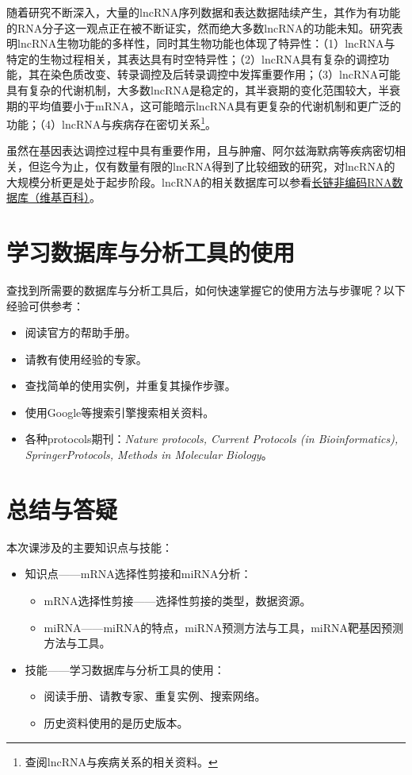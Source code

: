 \documentclass[11pt,a4paper,twoside]{book}
\begin{document}
随着研究不断深入，大量的lncRNA序列数据和表达数据陆续产生，其作为有功能的RNA分子这一观点正在被不断证实，然而绝大多数lncRNA的功能未知。研究表明lncRNA生物功能的多样性，同时其生物功能也体现了特异性：（1）lncRNA与特定的生物过程相关，其表达具有时空特异性；（2）lncRNA具有复杂的调控功能，其在染色质改变、转录调控及后转录调控中发挥重要作用；（3）lncRNA可能具有复杂的代谢机制，大多数lncRNA是稳定的，其半衰期的变化范围较大，半衰期的平均值要小于mRNA，这可能暗示lncRNA具有更复杂的代谢机制和更广泛的功能；（4）lncRNA与疾病存在密切关系\footnote{查阅lncRNA与疾病关系的相关资料。}。

虽然在基因表达调控过程中具有重要作用，且与肿瘤、阿尔兹海默病等疾病密切相关，但迄今为止，仅有数量有限的lncRNA得到了比较细致的研究，对lncRNA的大规模分析更是处于起步阶段。lncRNA的相关数据库可以参看\href{http://zh.wikipedia.org/wiki/\%E9\%95\%BF\%E9\%93\%BE\%E9\%9D\%9E\%E7\%BC\%96\%E7\%A0\%81RNA\%E6\%95\%B0\%E6\%8D\%AE\%E5\%BA\%93}{长链非编码RNA数据库（维基百科）}。

\section{学习数据库与分析工具的使用}
查找到所需要的数据库与分析工具后，如何快速掌握它的使用方法与步骤呢？以下经验可供参考：
\begin{itemize}
  \item 阅读官方的帮助手册。
  \item 请教有使用经验的专家。
  \item 查找简单的使用实例，并重复其操作步骤。
  \item 使用Google等搜索引擎搜索相关资料。
  \item 各种protocols期刊：\textit{Nature protocols, Current Protocols (in Bioinformatics), SpringerProtocols, Methods in Molecular Biology}。
\end{itemize}

\section{总结与答疑}
本次课涉及的主要知识点与技能：
\begin{itemize}
  \item 知识点——mRNA选择性剪接和miRNA分析：
    \begin{itemize}
      \item mRNA选择性剪接——选择性剪接的类型，数据资源。
      \item miRNA——miRNA的特点，miRNA预测方法与工具，miRNA靶基因预测方法与工具。
    \end{itemize}
  \item 技能——学习数据库与分析工具的使用：
    \begin{itemize}
      \item 阅读手册、请教专家、重复实例、搜索网络。
      \item 历史资料使用的是历史版本。
    \end{itemize}
\end{itemize}
\end{document}
